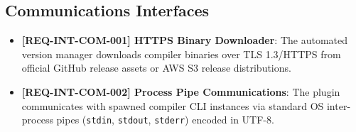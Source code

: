 \subsection{Communications Interfaces}
\begin{itemize}
    \item \textbf{[REQ-INT-COM-001] HTTPS Binary Downloader}:
    The automated version manager downloads compiler binaries over TLS 1.3/HTTPS from official GitHub release assets or AWS S3 release distributions.
    \item \textbf{[REQ-INT-COM-002] Process Pipe Communications}:
    The plugin communicates with spawned compiler CLI instances via standard OS inter-process pipes (\texttt{stdin}, \texttt{stdout}, \texttt{stderr}) encoded in UTF-8.
\end{itemize}
